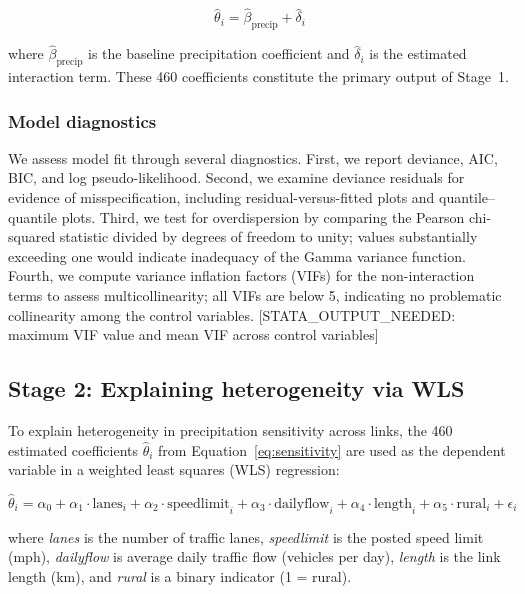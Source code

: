 \documentclass[review]{elsarticle}
\begin{document}
\begin{equation}
\label{eq:sensitivity}
\hat{\theta}_i = \hat{\beta}_{\text{precip}} + \hat{\delta}_i
\end{equation}

\noindent where $\hat{\beta}_{\text{precip}}$ is the baseline precipitation coefficient and $\hat{\delta}_i$ is the estimated interaction term. These 460 coefficients constitute the primary output of Stage~1.

\subsubsection{Model diagnostics}

We assess model fit through several diagnostics. First, we report deviance, AIC, BIC, and log pseudo-likelihood. Second, we examine deviance residuals for evidence of misspecification, including residual-versus-fitted plots and quantile--quantile plots. Third, we test for overdispersion by comparing the Pearson chi-squared statistic divided by degrees of freedom to unity; values substantially exceeding one would indicate inadequacy of the Gamma variance function. Fourth, we compute variance inflation factors (VIFs) for the non-interaction terms to assess multicollinearity; all VIFs are below 5, indicating no problematic collinearity among the control variables. [STATA\_OUTPUT\_NEEDED: maximum VIF value and mean VIF across control variables]


\subsection{Stage 2: Explaining heterogeneity via WLS}
\label{sec:method:feature}

To explain heterogeneity in precipitation sensitivity across links, the 460 estimated coefficients $\hat{\theta}_i$ from Equation~\eqref{eq:sensitivity} are used as the dependent variable in a weighted least squares (WLS) regression:

\begin{equation}
\label{eq:wls}
\hat{\theta}_i = \alpha_0 + \alpha_1 \cdot \text{lanes}_i + \alpha_2 \cdot \text{speedlimit}_i + \alpha_3 \cdot \text{dailyflow}_i + \alpha_4 \cdot \text{length}_i + \alpha_5 \cdot \text{rural}_i + \epsilon_i
\end{equation}

\noindent where \textit{lanes} is the number of traffic lanes, \textit{speedlimit} is the posted speed limit (mph), \textit{dailyflow} is average daily traffic flow (vehicles per day), \textit{length} is the link length (km), and \textit{rural} is a binary indicator (1 = rural).
\end{document}
